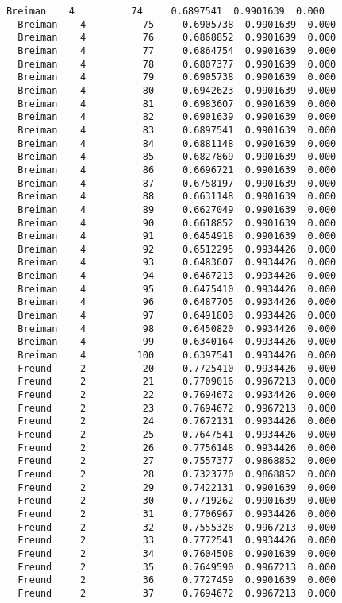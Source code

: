\documentclass[11pt]{article}
\begin{document}
\begin{Verbatim}[commandchars=\\\{\}]
  Breiman    4          74     0.6897541  0.9901639  0.000
  Breiman    4          75     0.6905738  0.9901639  0.000
  Breiman    4          76     0.6868852  0.9901639  0.000
  Breiman    4          77     0.6864754  0.9901639  0.000
  Breiman    4          78     0.6807377  0.9901639  0.000
  Breiman    4          79     0.6905738  0.9901639  0.000
  Breiman    4          80     0.6942623  0.9901639  0.000
  Breiman    4          81     0.6983607  0.9901639  0.000
  Breiman    4          82     0.6901639  0.9901639  0.000
  Breiman    4          83     0.6897541  0.9901639  0.000
  Breiman    4          84     0.6881148  0.9901639  0.000
  Breiman    4          85     0.6827869  0.9901639  0.000
  Breiman    4          86     0.6696721  0.9901639  0.000
  Breiman    4          87     0.6758197  0.9901639  0.000
  Breiman    4          88     0.6631148  0.9901639  0.000
  Breiman    4          89     0.6627049  0.9901639  0.000
  Breiman    4          90     0.6618852  0.9901639  0.000
  Breiman    4          91     0.6454918  0.9901639  0.000
  Breiman    4          92     0.6512295  0.9934426  0.000
  Breiman    4          93     0.6483607  0.9934426  0.000
  Breiman    4          94     0.6467213  0.9934426  0.000
  Breiman    4          95     0.6475410  0.9934426  0.000
  Breiman    4          96     0.6487705  0.9934426  0.000
  Breiman    4          97     0.6491803  0.9934426  0.000
  Breiman    4          98     0.6450820  0.9934426  0.000
  Breiman    4          99     0.6340164  0.9934426  0.000
  Breiman    4         100     0.6397541  0.9934426  0.000
  Freund     2          20     0.7725410  0.9934426  0.000
  Freund     2          21     0.7709016  0.9967213  0.000
  Freund     2          22     0.7694672  0.9934426  0.000
  Freund     2          23     0.7694672  0.9967213  0.000
  Freund     2          24     0.7672131  0.9934426  0.000
  Freund     2          25     0.7647541  0.9934426  0.000
  Freund     2          26     0.7756148  0.9934426  0.000
  Freund     2          27     0.7557377  0.9868852  0.000
  Freund     2          28     0.7323770  0.9868852  0.000
  Freund     2          29     0.7422131  0.9901639  0.000
  Freund     2          30     0.7719262  0.9901639  0.000
  Freund     2          31     0.7706967  0.9934426  0.000
  Freund     2          32     0.7555328  0.9967213  0.000
  Freund     2          33     0.7772541  0.9934426  0.000
  Freund     2          34     0.7604508  0.9901639  0.000
  Freund     2          35     0.7649590  0.9967213  0.000
  Freund     2          36     0.7727459  0.9901639  0.000
  Freund     2          37     0.7694672  0.9967213  0.000

\end{Verbatim}
\end{document}
